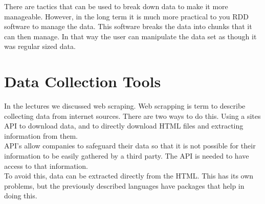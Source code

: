 \documentclass{article}
\begin{document}
There are tactics that can be used to break down data to make it more manageable. However, in the long term it is much more practical to you RDD software to manage the data. This software breaks the data into chunks that it can then manage. In that way the user can manipulate the data set as though it was regular sized data.
\section{Data Collection Tools}
In the lectures we discussed web scraping. Web scrapping is term to describe collecting data from internet sources. There are two ways to do this. Using a sites API to download data, and to directly download HTML files and extracting information from them.
\\

API's allow companies to safeguard their data so that it is not possible for their information to be easily gathered by a third party. The API is needed to have access to that information. 
\\

To avoid this, data can be extracted directly from the HTML. This has its own problems, but the previously described languages have packages that help in doing this. 
\end{document}
